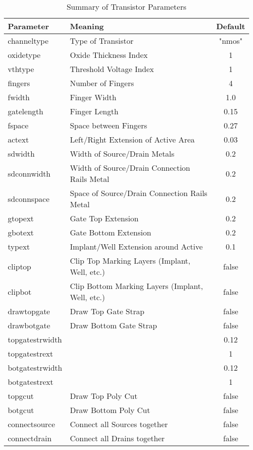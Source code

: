 \begin{table}[htb]
    \centering
    \begin{tabular}{llc}
        \toprule
        Parameter & Meaning & Default \\
        \midrule
        channeltype     & Type of Transistor & "nmos" \\
        oxidetype       & Oxide Thickness Index & 1 \\
        vthtype         & Threshold Voltage Index & 1 \\
        fingers         & Number of Fingers& 4 \\
        fwidth          & Finger Width & 1.0 \\
        gatelength      & Finger Length & 0.15 \\
        fspace          & Space between Fingers & 0.27 \\
        actext          & Left/Right Extension of Active Area & 0.03 \\
        sdwidth         & Width of Source/Drain Metals & 0.2 \\
        sdconnwidth     & Width of Source/Drain Connection Rails Metal & 0.2 \\
        sdconnspace     & Space of Source/Drain Connection Rails Metal & 0.2 \\
        gtopext         & Gate Top Extension & 0.2 \\
        gbotext         & Gate Bottom Extension & 0.2 \\
        typext          & Implant/Well Extension around Active & 0.1 \\
        cliptop         & Clip Top Marking Layers (Implant, Well, etc.) & false \\
        clipbot         & Clip Bottom Marking Layers (Implant, Well, etc.) & false \\
        drawtopgate     & Draw Top Gate Strap & false \\
        drawbotgate     & Draw Bottom Gate Strap & false \\
        topgatestrwidth && 0.12 \\
        topgatestrext   && 1 \\
        botgatestrwidth && 0.12 \\
        botgatestrext   && 1 \\
        topgcut         & Draw Top Poly Cut & false \\
        botgcut         & Draw Bottom Poly Cut & false \\
        connectsource   & Connect all Sources together & false \\
        connectdrain    & Connect all Drains together & false\\
        \bottomrule
    \end{tabular}
    \caption{Summary of Transistor Parameters}
    \label{tab:transistor}
\end{table}

